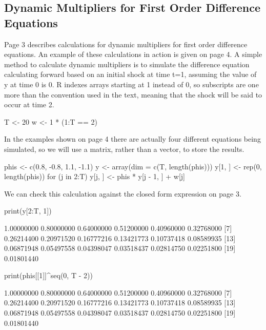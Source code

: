 \documentclass[a4paper]{article}
\renewcommand{\~}{\perispomeni}%
\begin{document}
\subsection{Dynamic Multipliers for First Order Difference Equations}
Page 3 describes calculations for dynamic multipliers for first order difference equations.  An example of these
calculations in action is given on page 4.  A simple method to calculate dynamic multipliers is to simulate
the difference equation calculating forward based on an initial shock at time t=1, assuming the value of y at time 0 is 0.
R indexes arrays starting at 1 instead of 0, so subscripts are one more than the convention used in the text, meaning that
the shock will be said to occur at time 2.
\begin{Schunk}
\begin{Sinput}
 T <- 20
 w <- 1 * (1:T == 2)
\end{Sinput}
\end{Schunk}
In the examples shown on page 4 there are actually four different equations being simulated,
so we will use a matrix, rather than a vector, to store the results.
\begin{Schunk}
\begin{Sinput}
 phis <- c(0.8, -0.8, 1.1, -1.1)
 y <- array(dim = c(T, length(phis)))
 y[1, ] <- rep(0, length(phis))
 for (j in 2:T) y[j, ] <- phis * y[j - 1, ] + w[j]
\end{Sinput}
\end{Schunk}
We can check this calculation against the closed form expression on page 3.
\begin{Schunk}
\begin{Sinput}
 print(y[2:T, 1])
\end{Sinput}
\begin{Soutput}
 [1] 1.00000000 0.80000000 0.64000000 0.51200000 0.40960000 0.32768000
 [7] 0.26214400 0.20971520 0.16777216 0.13421773 0.10737418 0.08589935
[13] 0.06871948 0.05497558 0.04398047 0.03518437 0.02814750 0.02251800
[19] 0.01801440
\end{Soutput}
\begin{Sinput}
 print(phis[[1]]^seq(0, T - 2))
\end{Sinput}
\begin{Soutput}
 [1] 1.00000000 0.80000000 0.64000000 0.51200000 0.40960000 0.32768000
 [7] 0.26214400 0.20971520 0.16777216 0.13421773 0.10737418 0.08589935
[13] 0.06871948 0.05497558 0.04398047 0.03518437 0.02814750 0.02251800
[19] 0.01801440
\end{Soutput}
\end{Schunk}
\end{document}
